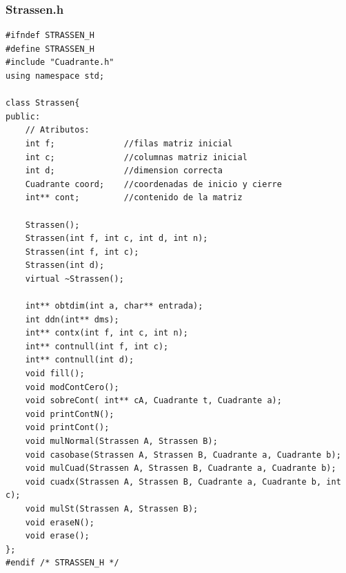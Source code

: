 \documentclass[12pt,letterpaper]{article}
\begin{document}
\subsubsection*{Strassen.h}
\begin{lstlisting}
#ifndef STRASSEN_H
#define STRASSEN_H
#include "Cuadrante.h"
using namespace std;

class Strassen{
public:
	// Atributos:
	int f;				//filas matriz inicial
	int c;				//columnas matriz inicial
	int d;				//dimension correcta
    Cuadrante coord;	//coordenadas de inicio y cierre
    int** cont;			//contenido de la matriz
    
	Strassen();	
	Strassen(int f, int c, int d, int n);
	Strassen(int f, int c);
	Strassen(int d);
	virtual ~Strassen();
	
	int** obtdim(int a, char** entrada);
	int ddn(int** dms);
	int** contx(int f, int c, int n);
	int** contnull(int f, int c);
	int** contnull(int d);
	void fill();
	void modContCero();
    void sobreCont( int** cA, Cuadrante t, Cuadrante a);
    void printContN();
    void printCont();
    void mulNormal(Strassen A, Strassen B);
    void casobase(Strassen A, Strassen B, Cuadrante a, Cuadrante b);
    void mulCuad(Strassen A, Strassen B, Cuadrante a, Cuadrante b);
    void cuadx(Strassen A, Strassen B, Cuadrante a, Cuadrante b, int c);
    void mulSt(Strassen A, Strassen B);
	void eraseN();
	void erase();
};
#endif /* STRASSEN_H */
\end{lstlisting}
\end{document}
